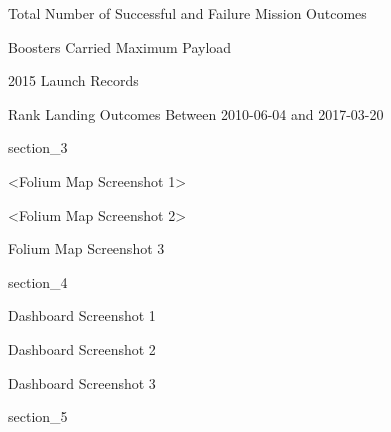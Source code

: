 \begin{frame}{Total Number of Successful and Failure Mission Outcomes}

\end{frame}

\begin{frame}{Boosters Carried Maximum Payload}

\end{frame}

\begin{frame}{2015 Launch Records}

\end{frame}

\begin{frame}{Rank Landing Outcomes Between 2010-06-04 and 2017-03-20}

\end{frame}

{
{section_3}
\begin{frame}[plain]
\end{frame}
}

\begin{frame}{<Folium Map Screenshot 1>}

\end{frame}

\begin{frame}{<Folium Map Screenshot 2>}

\end{frame}

\begin{frame}{Folium Map Screenshot 3}

\end{frame}

{
{section_4}
\begin{frame}[plain]
\end{frame}
}

\begin{frame}{Dashboard Screenshot 1}

\end{frame}

\begin{frame}{Dashboard Screenshot 2}

\end{frame}

\begin{frame}{Dashboard Screenshot 3}

\end{frame}

{
{section_5}
\begin{frame}[plain]
\end{frame}
}


